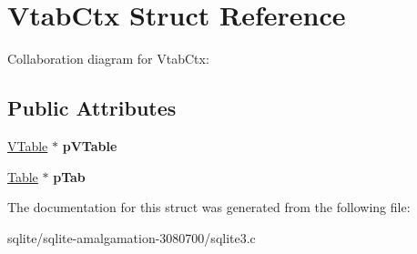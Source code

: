 \hypertarget{struct_vtab_ctx}{\section{Vtab\+Ctx Struct Reference}
\label{struct_vtab_ctx}
}


Collaboration diagram for Vtab\+Ctx\+:
\subsection*{Public Attributes}
\begin{DoxyCompactItemize}
\item 
\hypertarget{struct_vtab_ctx_a99bbe533ea0423138d7dddba5aa662b8}{\hyperlink{struct_v_table}{V\+Table} $\ast$ {\bfseries p\+V\+Table}}\label{struct_vtab_ctx_a99bbe533ea0423138d7dddba5aa662b8}

\item 
\hypertarget{struct_vtab_ctx_a4040cb18a83afebad0ad7e7f20572b09}{\hyperlink{struct_table}{Table} $\ast$ {\bfseries p\+Tab}}\label{struct_vtab_ctx_a4040cb18a83afebad0ad7e7f20572b09}

\end{DoxyCompactItemize}


The documentation for this struct was generated from the following file\+:\begin{DoxyCompactItemize}
\item 
sqlite/sqlite-\/amalgamation-\/3080700/sqlite3.\+c\end{DoxyCompactItemize}
